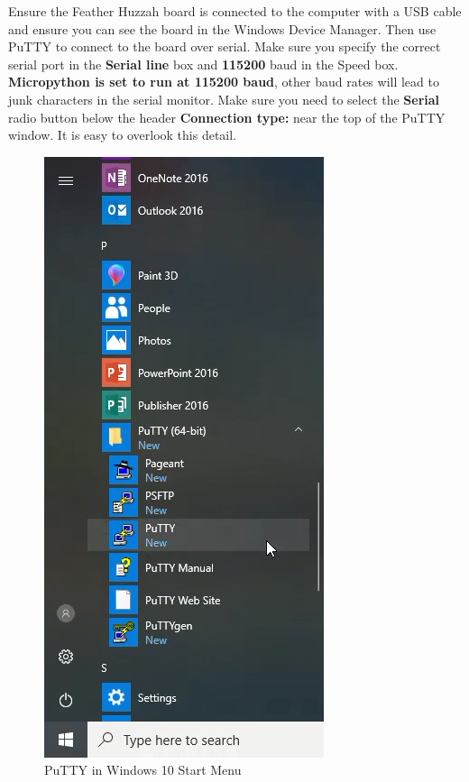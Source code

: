 \documentclass{book}
\makeatletter
\def\maxwidth{\ifdim\Gin@nat@width>\linewidth\linewidth
    \else\Gin@nat@width\fi}
\let\Oldincludegraphics\includegraphics
\renewcommand{\includegraphics}[1]{\Oldincludegraphics[width=.8\maxwidth]{#1}}
\makeatother
\begin{document}
    
        Ensure the Feather Huzzah board is connected to the computer with a USB
cable and ensure you can see the board in the Windows Device Manager.
Then use PuTTY to connect to the board over serial. Make sure you
specify the correct serial port in the \textbf{Serial line} box and
\textbf{115200} baud in the Speed box. \textbf{Micropython is set to run
at 115200 baud}, other baud rates will lead to junk characters in the
serial monitor. Make sure you need to select the \textbf{Serial} radio
button below the header \textbf{Connection type:} near the top of the
PuTTY window. It is easy to overlook this detail.

\begin{figure}
\centering
\includegraphics{images/putty_in_start_menu.png}
\caption{PuTTY in Windows 10 Start Menu}
\end{figure}
\end{document}
